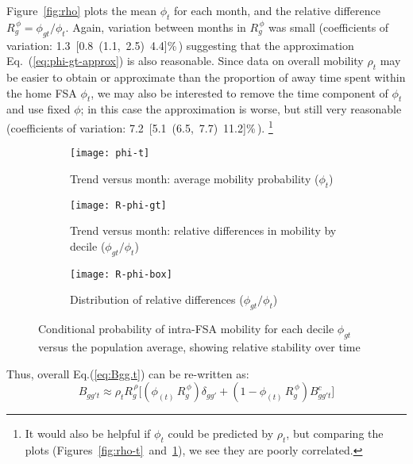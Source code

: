 Figure~\ref{fig:rho} plots the mean $\phi_{t}$ for each month,
and the relative difference $R^{\,\phi}_{g} = \phi_{gt} / \phi_{t}$.
Again, variation between months in $R^{\,\phi}_{g}$ was small
(coefficients of variation: 1.3~[0.8~(1.1,~2.5)~4.4]\%\,)
suggesting that the approximation Eq.~(\ref{eq:phi-gt-approx}) is also reasonable.
Since data on overall mobility $\rho_{t}$ may be easier to obtain or approximate than
the proportion of away time spent within the home FSA $\phi_{t}$,
we may also be interested to remove the time component of $\phi_{t}$ and use fixed $\phi$;
in this case the approximation is worse, but still very reasonable
(coefficients of variation: 7.2~[5.1~(6.5,~7.7)~11.2]\%\,).%
\footnote{It would also be helpful if $\phi_{t}$ could be predicted by $\rho_{t}$,
  but comparing the plots (Figures~\ref{fig:rho-t}~and~\ref{fig:phi-t}),
  we see they are poorly correlated.}
\begin{figure}[ht]
  \begin{subfigure}[t]{0.297\linewidth}
    \texttt{[image: phi-t]}
    \caption{Trend versus month: average mobility probability ($\phi_{t}$)}
    \label{fig:phi-t}
  \end{subfigure}\hfill
  \begin{subfigure}[t]{0.33\linewidth}
    \texttt{[image: R-phi-gt]}
    \caption{Trend versus month: relative differences in mobility by decile ($\phi_{gt} / \phi_{t}$)}
    \label{fig:phi-gt}
  \end{subfigure}\hfill
  \begin{subfigure}[t]{0.33\linewidth}
    \texttt{[image: R-phi-box]}
    \caption{Distribution of relative differences ($\phi_{gt} / \phi_{t}$)}
    \label{fig:phi-box}
  \end{subfigure}
  \caption{Conditional probability of intra-FSA mobility for each decile $\phi_{gt}$  %
    versus the population average,
    showing relative stability over time}
  \label{fig:phi}
\end{figure}
\par
Thus, overall Eq.(\ref{eq:Bgg.t}) can be re-written as:
\begin{equation}\label{eq:Bgg.t.approx}
  B_{gg't} \approx \rho_{t} R^{\,\rho}_{g} \Big[
    (\phi_{(t)}\,R^{\,\phi}_{g}) \delta_{gg'} + (1-\phi_{(t)}\,R^{\,\phi}_{g}) B^c_{gg't}
  \Big]
\end{equation}
